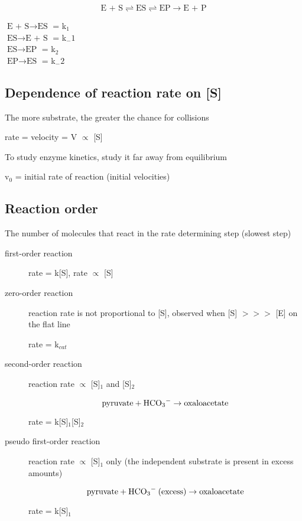 \documentclass[letterpaper, 12pt]{article}
\begin{document}
$$ \text{E + S} \rightleftharpoons \text{ES} \rightleftharpoons \text{EP} \to \text{E + P}$$

$\text{E + S} \to \text{ES} $ = k$_1$ \\
$\text{ES} \to \text{E + S} $ = k$_-1$ \\
$\text{ES} \to \text{EP} $ = k$_2$ \\
$\text{EP} \to \text{ES} $ = k$_-2$

\subsection*{Dependence of reaction rate on [S]}

The more substrate, the greater the chance for collisions

rate = velocity = V $\propto$ [S]

To study enzyme kinetics, study it far away from equilibrium

v$_0$ = initial rate of reaction (initial velocities)

\subsection*{Reaction order}

The number of molecules that react in the rate determining step (slowest step)

\begin{description}
\item [first-order reaction] rate = k[S], rate $\propto$ [S]
\item [zero-order reaction] reaction rate is not proportional to [S], observed when [S] $>>>$ [E] on the flat line

rate = k$_{cat}$
\item [second-order reaction] reaction rate $\propto$ [S]$_1$ and [S]$_2$

$$ \text{pyruvate} + \ce{HCO3-} \to \text{oxaloacetate} $$

rate = k[S]$_1$[S]$_2$

\item [pseudo first-order reaction] reaction rate $\propto$ [S]$_1$ only (the independent substrate is present in excess amounts)

$$ \text{pyruvate} + \ce{HCO3-} \: \text{(excess)} \to \text{oxaloacetate} $$

rate = k[S]$_1$

\end{description}
\end{document}
